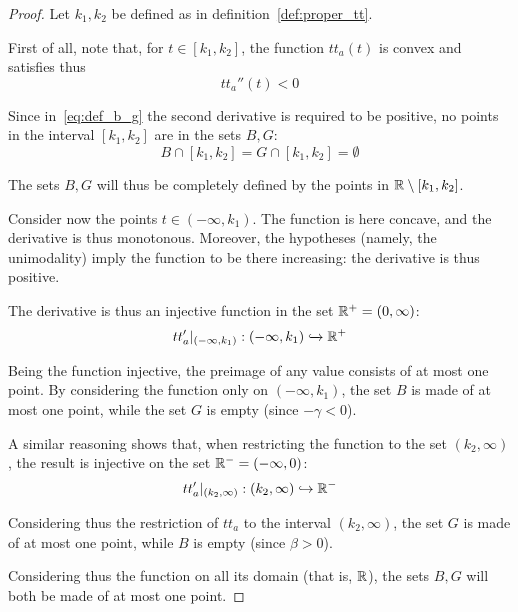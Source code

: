 \begin{proof}
  Let \(k_1, k_2\) be defined as in definition~\ref{def:proper_tt}.

  First of all, note that, for \(t\in[k_1, k_2]\), the function \(tt_a(t)\) is convex and satisfies thus
  \[tt_a''(t) < 0\]

  Since in~\eqref{eq:def_b_g} the second derivative is required to be positive,
  no points in the interval \([k_1, k_2]\) are in the sets \(B, G\):
  \begin{equation*}
    B\cap[k_1, k_2] = G\cap[k_1, k_2] = \emptyset
  \end{equation*}

  The sets \(B, G\) will thus be completely defined by the points in \(\mathbb{R}\setminus[k_1, k_2]\).

  Consider now the points \(t\in(-\infty, k_1)\).
  The function is here concave, and the derivative is thus monotonous.
  Moreover, the hypotheses (namely, the unimodality) imply the function to be there increasing:
  the derivative is thus positive.

  The derivative is thus an injective function in the set \(\mathbb{R}^+ = (0, \infty)\):
  \begin{equation*}
    tt_a'|_{(-\infty, k_1)}:(-\infty, k_1) \xhookrightarrow{} \mathbb{R}^+
  \end{equation*}

  Being the function injective, the preimage of any value consists of at most one point.
  By considering the function only on \((-\infty, k_1)\),
  the set \(B\) is made of at most one point,
  while the set \(G\) is empty (since \(-\gamma < 0\)).

  A similar reasoning shows that, when restricting the function to the set \((k_2, \infty)\),
  the result is injective on the set \(\mathbb{R}^- = (-\infty, 0)\):
  \begin{equation*}
    tt_a'|_{(k_2, \infty)}:(k_2, \infty) \hookrightarrow{} \mathbb{R}^-
  \end{equation*}

  Considering thus the restriction of \(tt_a\) to the interval \((k_2, \infty)\),
  the set \(G\) is made of at most one point,
  while \(B\) is empty (since \(\beta > 0\)).

  Considering thus the function on all its domain (that is, \(\mathbb{R}\)),
  the sets \(B, G\) will both be made of at most one point.

\end{proof}




